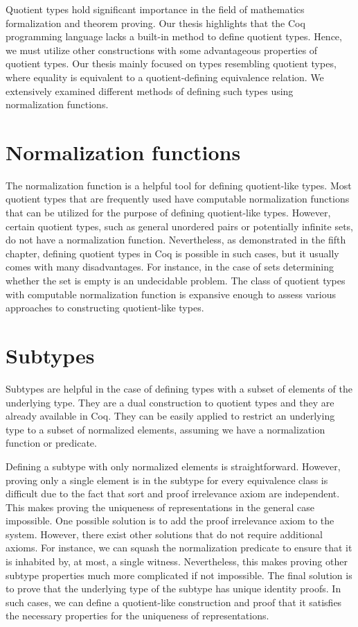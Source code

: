 Quotient types hold significant importance in the field of mathematics formalization and theorem proving. Our thesis highlights that the Coq programming language lacks a built-in method to define quotient types. Hence, we must utilize other constructions with some advantageous properties of quotient types. Our thesis mainly focused on types resembling quotient types, where equality is equivalent to a quotient-defining equivalence relation. We extensively examined different methods of defining such types using normalization functions.

\section{Normalization functions}
The normalization function is a helpful tool for defining quotient-like types. Most quotient types that are frequently used have computable normalization functions that can be utilized for the purpose of defining quotient-like types. However, certain quotient types, such as general unordered pairs or potentially infinite sets, do not have a normalization function. Nevertheless, as demonstrated in the fifth chapter, defining quotient types in Coq is possible in such cases, but it usually comes with many disadvantages. For instance, in the case of sets determining whether the set is empty is an undecidable problem. The class of quotient types with computable normalization function is expansive enough to assess various approaches to constructing quotient-like types.
\section{Subtypes}
Subtypes are helpful in the case of defining types with a subset of elements of the underlying type. They are a dual construction to quotient types and they are already available in Coq. They can be easily applied to restrict an underlying type to a subset of normalized elements, assuming we have a normalization function or predicate.

Defining a subtype with only normalized elements is straightforward. However, proving only a single element is in the subtype for every equivalence class is difficult due to the fact that  sort and proof irrelevance axiom are independent. This makes proving the uniqueness of representations in the general case impossible. One possible solution is to add the proof irrelevance axiom to the system. However, there exist other solutions that do not require additional axioms. For instance, we can squash the normalization predicate to ensure that it is inhabited by, at most, a single witness. Nevertheless, this makes proving other subtype properties much more complicated if not impossible. The final solution is to prove that the underlying type of the subtype has unique identity proofs. In such cases, we can define a quotient-like construction and proof that it satisfies the necessary properties for the uniqueness of representations.

